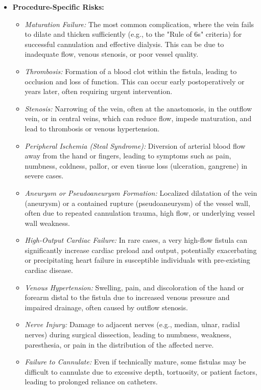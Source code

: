 \begin{itemize}
  \item \textbf{Procedure-Specific Risks:}
  \begin{itemize}
    \item \textit{Maturation Failure:} The most common complication, where the vein fails to dilate and thicken sufficiently (e.g., to the "Rule of 6s" criteria) for successful cannulation and effective dialysis. This can be due to inadequate flow, venous stenosis, or poor vessel quality.
    \item \textit{Thrombosis:} Formation of a blood clot within the fistula, leading to occlusion and loss of function. This can occur early postoperatively or years later, often requiring urgent intervention.
    \item \textit{Stenosis:} Narrowing of the vein, often at the anastomosis, in the outflow vein, or in central veins, which can reduce flow, impede maturation, and lead to thrombosis or venous hypertension.
    \item \textit{Peripheral Ischemia (Steal Syndrome):} Diversion of arterial blood flow away from the hand or fingers, leading to symptoms such as pain, numbness, coldness, pallor, or even tissue loss (ulceration, gangrene) in severe cases.
    \item \textit{Aneurysm or Pseudoaneurysm Formation:} Localized dilatation of the vein (aneurysm) or a contained rupture (pseudoaneurysm) of the vessel wall, often due to repeated cannulation trauma, high flow, or underlying vessel wall weakness.
    \item \textit{High-Output Cardiac Failure:} In rare cases, a very high-flow fistula can significantly increase cardiac preload and output, potentially exacerbating or precipitating heart failure in susceptible individuals with pre-existing cardiac disease.
    \item \textit{Venous Hypertension:} Swelling, pain, and discoloration of the hand or forearm distal to the fistula due to increased venous pressure and impaired drainage, often caused by outflow stenosis.
    \item \textit{Nerve Injury:} Damage to adjacent nerves (e.g., median, ulnar, radial nerves) during surgical dissection, leading to numbness, weakness, paresthesia, or pain in the distribution of the affected nerve.
    \item \textit{Failure to Cannulate:} Even if technically mature, some fistulas may be difficult to cannulate due to excessive depth, tortuosity, or patient factors, leading to prolonged reliance on catheters.
  \end{itemize}
\end{itemize}

